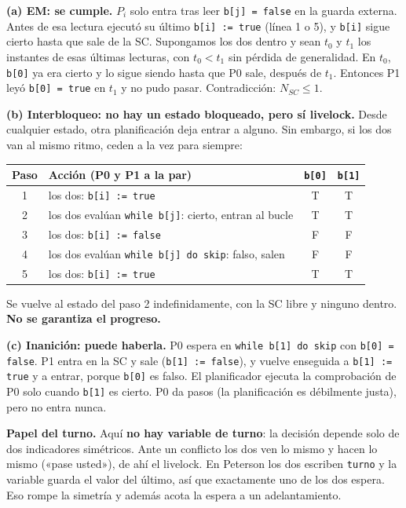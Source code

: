 \documentclass[11pt,a4paper,oneside]{report}
\begin{document}
\begin{solucion}
\textbf{(a) EM: se cumple.} $P_i$ solo entra tras leer \texttt{b[j] = false} en la guarda externa. Antes de esa
lectura ejecutó su último \texttt{b[i] := true} (línea 1 o 5), y \texttt{b[i]} sigue cierto hasta que sale de la
SC. Supongamos los dos dentro y sean $t_0$ y $t_1$ los instantes de esas últimas lecturas, con $t_0 < t_1$ sin
pérdida de generalidad. En $t_0$, \texttt{b[0]} ya era cierto y lo sigue siendo hasta que P0 sale, después de
$t_1$. Entonces P1 leyó \texttt{b[0] = true} en $t_1$ y no pudo pasar. Contradicción: $N_{SC} \le 1$.

\textbf{(b) Interbloqueo: no hay un estado bloqueado, pero sí livelock.} Desde cualquier estado, otra
planificación deja entrar a alguno. Sin embargo, si los dos van al mismo ritmo, ceden a la vez para siempre:
\begin{center}\small
\begin{tabular}{clcc}
\toprule
\textbf{Paso} & \textbf{Acción (P0 y P1 a la par)} & \texttt{b[0]} & \texttt{b[1]} \\ \midrule
1 & los dos: \texttt{b[i] := true} & T & T \\
2 & los dos evalúan \texttt{while b[j]}: cierto, entran al bucle & T & T \\
3 & los dos: \texttt{b[i] := false} & F & F \\
4 & los dos evalúan \texttt{while b[j] do skip}: falso, salen & F & F \\
5 & los dos: \texttt{b[i] := true} & T & T \\
\bottomrule
\end{tabular}
\end{center}
Se vuelve al estado del paso 2 indefinidamente, con la SC libre y ninguno dentro. \textbf{No se garantiza el
progreso.}

\textbf{(c) Inanición: puede haberla.} P0 espera en \texttt{while b[1] do skip} con \texttt{b[0] = false}. P1 entra
en la SC y sale (\texttt{b[1] := false}), y vuelve enseguida a \texttt{b[1] := true} y a entrar, porque
\texttt{b[0]} es falso. El planificador ejecuta la comprobación de P0 solo cuando \texttt{b[1]} es cierto. P0 da
pasos (la planificación es débilmente justa), pero no entra nunca.

\textbf{Papel del turno.} Aquí \textbf{no hay variable de turno}: la decisión depende solo de dos indicadores
simétricos. Ante un conflicto los dos ven lo mismo y hacen lo mismo («pase usted»), de ahí el livelock. En
Peterson los dos escriben \texttt{turno} y la variable guarda el valor del último, así que exactamente uno de los
dos espera. Eso rompe la simetría y además acota la espera a un adelantamiento.
\end{solucion}
\end{document}
